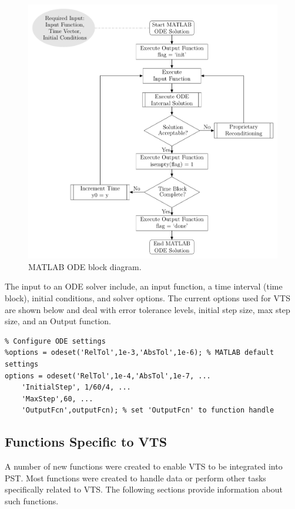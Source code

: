 \begin{figure}[!h]
	\centering
	\footnotesize
	\includegraphics[width=.8\linewidth]{./../../one-offs/200804-ODEblockDiagram/200804-ODEblockDiagram}
	\caption{MATLAB ODE block diagram.}
	\label{fig: MATLAB ode block diagram}
\end{figure}%

The input to an ODE solver include, an input function, a time interval (time block), initial conditions, and solver options.
The current options used for VTS are shown below and deal with error tolerance levels, initial step size, max step size, and an Output function.

\begin{verbatim}
% Configure ODE settings
%options = odeset('RelTol',1e-3,'AbsTol',1e-6); % MATLAB default settings
options = odeset('RelTol',1e-4,'AbsTol',1e-7, ...
    'InitialStep', 1/60/4, ...
    'MaxStep',60, ...
    'OutputFcn',outputFcn); % set 'OutputFcn' to function handle
\end{verbatim}


\subsection{Functions Specific to VTS}  
A number of new functions were created to enable VTS to be integrated into PST.
Most functions were created to handle data or perform other tasks specifically related to VTS.
The following sections provide information about such functions.


